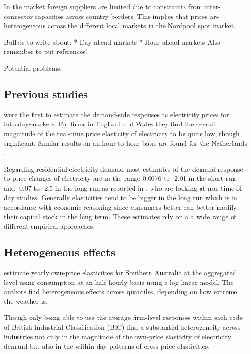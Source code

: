 In the market foreign suppliers are limited due to constraints from inter-connector capacities across country borders. This implies that prices are heterogeneous across the different local markets in the Nordpool spot market. 

Bullets to write about: 
* Day-ahead markets
* Hour ahead markets 
Also remember to put references! 

Potential problems: 


\subsection{Previous studies}
\label{subsec:b_results}
\citet{patrick2001estimating} were the first to estimate the demand-side responses to electricity prices for intraday-markets. For firms in England and Wales they find the overall magnitude of the real-time price elasticity of electricity to be quite low, though significant. Similar results on an hour-to-hour basis are found for the Netherlands \citep{lijesen2007real}. \par
Regarding residential electricity demand most estimates of the demand response to price changes of electricity are in the range 0.0076 to -2.01 in the short run and -0.07 to -2.5 in the long run as reported in \citet{espey2004turning}, who are looking at non-time-of-day studies. Generally elasticities tend to be bigger in the long run which is in accordance with economic reasoning since consumers better can better modify their capital stock in the long term. These estimates rely on a a wide range of different empirical approaches.

\subsection{Heterogeneous effects}
\label{subsec:b_heterogeneity}
\citet{fan2011price} estimate yearly own-price elasticities for Southern Australia at the aggregated level using consumption at an half-hourly basis using a log-linear model. The authors find heterogeneous effects across quantiles, depending on how extreme the weather is. \par
Though only being able to use the average firm-level responses within each code of British Industrial Classification (BIC) \citet{patrick2001estimating} find a substantial heterogeneity across industries not only in the magnitude of the own-price elasticity of electricity demand but also in the within-day patterns of cross-price elasticities.

